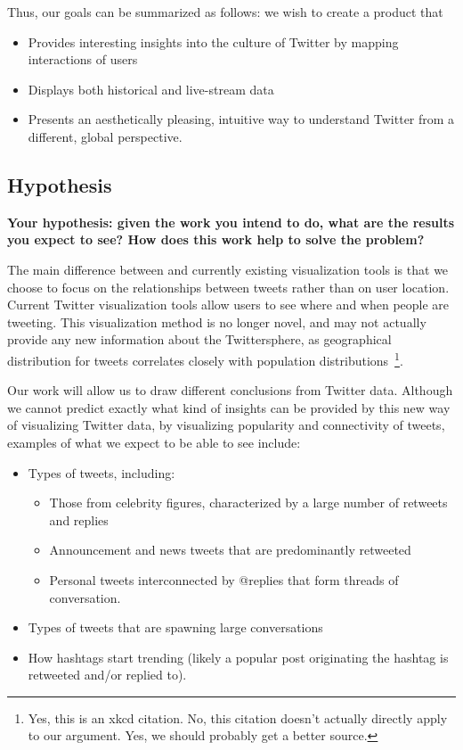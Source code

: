 Thus, our goals can be summarized as follows: we wish to create a product that
\begin{itemize}[noitemsep]
\item Provides interesting insights into the culture of Twitter by mapping interactions of users
\item Displays both historical and live-stream data
\item Presents an aesthetically pleasing, intuitive way to understand Twitter from a different, global perspective.
\end{itemize}

\subsection{Hypothesis} \label{sec:hypothesis}
\textbf{Your hypothesis: given the work you intend to do, what are the results you expect to see? How does this work help to solve the problem?}

The main difference between \sys and currently existing visualization tools is that we choose
to focus on the relationships between tweets rather than on user location. Current Twitter visualization tools
allow users to see where and when people are tweeting. This visualization method is no longer novel, and may not actually provide
any new information about the Twittersphere, as geographical distribution for tweets correlates closely with population 
distributions~\cite{xkcd-heatmap}\footnote{Yes, this is an xkcd citation. No, this citation doesn't actually directly apply
to our argument. Yes, we should probably get a better source.}. 

Our work will allow us to draw different conclusions from Twitter
data. Although we cannot predict exactly what kind of insights can be provided by this new way of visualizing Twitter data,
by visualizing popularity and connectivity of tweets, examples of what we expect to be able to see include:
\begin{itemize}[noitemsep]
\item Types of tweets, including:
\begin{itemize}[noitemsep, nolistsep]
\item Those from celebrity figures, characterized by a large number of retweets and replies
\item Announcement and news tweets that are predominantly retweeted
\item Personal tweets interconnected by @replies that form threads of conversation.
\end{itemize}
\item Types of tweets that are spawning large conversations
\item How hashtags start trending (likely a popular post originating the hashtag is retweeted and/or replied to). 
\end{itemize}

